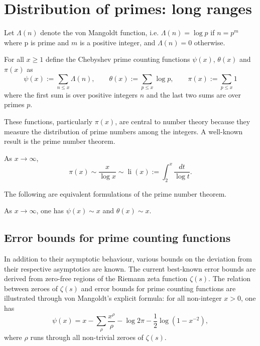 \chapter{Distribution of primes: long ranges}
\label{chap:prime_counting_function}

Let $\Lambda(n)$ denote the von Mangoldt function, i.e. $\Lambda(n) = \log p$ if $n = p^m$ where p is prime and $m$ is a positive integer, and $\Lambda(n) = 0$ otherwise.

\begin{definition}
For all $x \ge 1$ define the Chebyshev prime counting functions $\psi(x)$, $\theta(x)$ and $\pi(x)$ as
\[
\psi(x) := \sum_{n \le x}\Lambda(n),\qquad \theta(x) := \sum_{p \le x}\log p,\qquad \pi(x) := \sum_{p \le x}1
\]
where the first sum is over positive integers $n$ and the last two sums are over primes $p$.
\end{definition}

These functions, particularly $\pi(x)$, are central to number theory because they measure the distribution of prime numbers among the integers. A well-known result is the prime number theorem.

\begin{theorem}
As $x \to \infty$,
\[
\pi(x) \sim \frac{x}{\log x} \sim \operatorname{li}(x) := \int_2^{x}\frac{dt}{\log t}.
\]
\end{theorem}

The following are equivalent formulations of the prime number theorem.

\begin{theorem}
As $x \to \infty$, one has $\psi(x) \sim x$ and $\theta(x) \sim x$.
\end{theorem}

\section{Error bounds for prime counting functions}
In addition to their asymptotic behaviour, various bounds on the deviation from their respective asymptotics are known. The current best-known error bounds are derived from zero-free regions of the Riemann zeta function $\zeta(s)$. The relation between zeroes of $\zeta(s)$ and error bounds for prime counting functions are illustrated through von Mangoldt's explicit formula: for all non-integer $x > 0$, one has
\[
\psi(x) = x - \sum_{\rho}\frac{x^\rho}{\rho} - \log 2\pi - \frac{1}{2}\log(1 - x^{-2}),
\]
where $\rho$ runs through all non-trivial zeroes of $\zeta(s)$.

